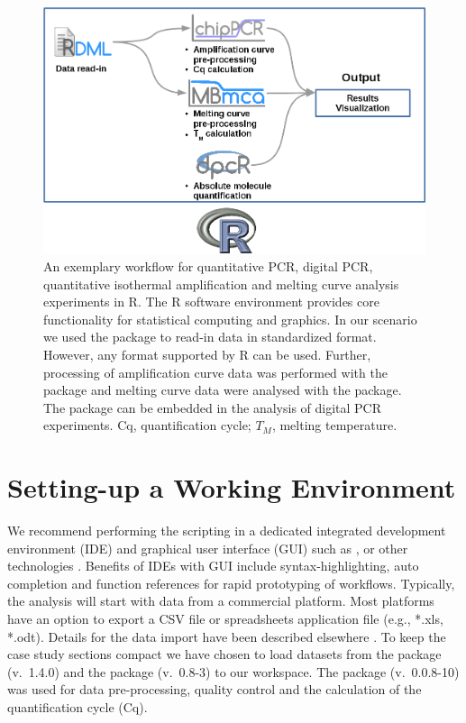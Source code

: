 \begin{figure}[htbp]
  \centering
  \includegraphics[clip=true,trim=0cm 0cm 0cm 0cm]{figures/workflow.png}
  \caption{An exemplary workflow for quantitative PCR, digital PCR, quantitative 
isothermal amplification and melting curve analysis experiments in R. The R 
software environment provides core functionality for statistical computing and 
graphics. In our scenario we used the  package to read-in data in 
standardized format. However, any format supported by R can be used. Further, 
processing of amplification curve data was performed with the  
package and melting curve data were analysed with the  package. 
The  package can be embedded in the analysis of digital PCR 
experiments. Cq, quantification cycle; $T_{M}$, melting temperature. 
} 
\label{figure:workflow}
\end{figure}

\section{Setting-up a Working Environment}

We recommend performing the scripting in a dedicated integrated development 
environment (IDE) and graphical user interface (GUI) such as  
\citep{rodiger_rkward_2012},  \citep{RStudio, gandrud_2013} or 
other technologies \citep{Valero_2012}. Benefits of IDEs with GUI include 
syntax-highlighting, auto completion and function references for rapid 
prototyping of workflows. Typically, the analysis will start with data from a 
commercial platform. Most platforms have an option to export a CSV file or 
spreadsheets application file (e.g., *.xls, *.odt). Details for the data 
import have been described elsewhere \citep{RDCT2010c, rodiger_rkward_2012}. To 
keep the case study sections compact we have chosen to load datasets from the 
 package \citep{ritz_2008} (v.~1.4.0) and the  
package (v.~0.8-3) to our workspace. The  package 
\citep{roediger_2015_Bioinformatics} (v.~0.0.8-10) was used for data 
pre-processing, quality control and  the calculation of the quantification cycle 
(Cq).

